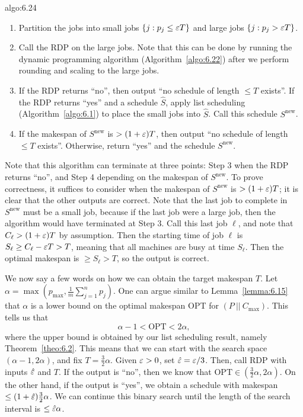 \begin{algo}{algo:6.24}
    \begin{enumerate}[(1)]
        \item Partition the jobs into small jobs $\{j : p_j \leq \varepsilon T\}$ 
        and large jobs $\{j : p_j > \varepsilon T\}$. 
        \item Call the RDP on the large jobs. Note that this can be done 
        by running the dynamic programming algorithm (Algorithm~\ref{algo:6.22}) 
        after we perform rounding and scaling to the large jobs. 
        \item If the RDP returns ``no'', then output ``no schedule of 
        length $\leq T$ exists''. If the RDP returns ``yes'' and a schedule 
        $\hat S$, apply list scheduling (Algorithm~\ref{algo:6.1}) to place 
        the small jobs into $\hat S$. Call this schedule $S^\text{new}$. 
        \item If the makespan of $S^{\text{new}}$ is $>(1+\varepsilon)T$, then 
        output ``no schedule of length $\leq T$ exists''. Otherwise, 
        return ``yes'' and the schedule $S^\text{new}$. 
    \end{enumerate}
\end{algo}

Note that this algorithm can terminate at three points: Step 3 when the 
RDP returns ``no'', and Step 4 depending on the makespan of $S^{\text{new}}$. 
To prove correctness, it suffices to consider when the makespan of 
$S^{\text{new}}$ is $>(1+\varepsilon)T$; it is clear that the other outputs are correct. 
Note that the last job to complete in $S^{\text{new}}$ must be a small job, 
because if the last job were a large job, then the algorithm would have terminated 
at Step 3. Call this last job $\ell$, and note that $C_\ell > (1+\varepsilon)T$ 
by assumption. Then the starting time of job $\ell$ is $S_\ell \geq 
C_\ell - \varepsilon T > T$, meaning that all machines are busy at time $S_\ell$. 
Then the optimal makespan is $\geq S_\ell > T$, so the output is correct. 

We now say a few words on how we can obtain the target makespan $T$. 
Let $\alpha = \max(p_{\max}, \frac1m \sum_{j=1}^n p_j)$. One can argue 
similar to Lemma~\ref{lemma:6.15} that $\alpha$ is a lower bound on the 
optimal makespan OPT for $(P~||~C_{\max})$. This tells us that 
\[ \alpha - 1 < \text{OPT} < 2\alpha, \] 
where the upper bound is obtained by our list scheduling result, namely 
Theorem~\ref{theo:6.2}. This means that we can start with the search 
space $(\alpha - 1, 2\alpha)$, and fix $T = \frac32\alpha$. Given 
$\varepsilon > 0$, set $\hat {\varepsilon} = \varepsilon/3$. Then, call RDP with inputs 
$\hat {\varepsilon}$ and $T$. If the output is ``no'', then we know that 
$\text{OPT} \in (\frac32\alpha, 2\alpha)$. On the other hand, if the 
output is ``yes'', we obtain a schedule with makespan $\leq (1 + 
\hat {\varepsilon}) \frac32\alpha$. We can continue this binary search until the 
length of the search interval is $\leq \hat{\varepsilon} \alpha$. 

